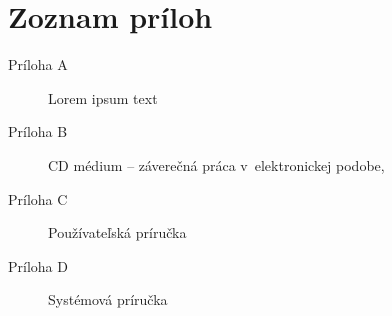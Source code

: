 \chapter*{Zoznam príloh}

\begin{description}
	\item[Príloha A] Lorem ipsum text
    \item[Príloha B] CD médium -- záverečná práca v~elektronickej podobe,
    \item[Príloha C] Používateľská príručka
    \item[Príloha D] Systémová príručka
\end{description}

